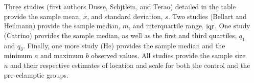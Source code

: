 \documentclass{article}
\begin{document}
Three studies (first authors Dusse, Schjtlein, and Terao) detailed in the table provide the sample mean, $\overline x$, and standard deviation, $s$. Two studies (Bellart and Heilmann) provide the sample median, $m$, and interquartile range, $\operatorname{iqr}$. One study (Catrino) provides the sample median, as well as the first and third quartiles, $q_1$ and $q_3$. Finally, one more study (He) provides the sample median and the minimum $a$ and maximum $b$ observed values. All studies provide the sample size $n$ and their respective estimates of location and scale for both the control and the pre-eclamptic groups.
\end{document}

